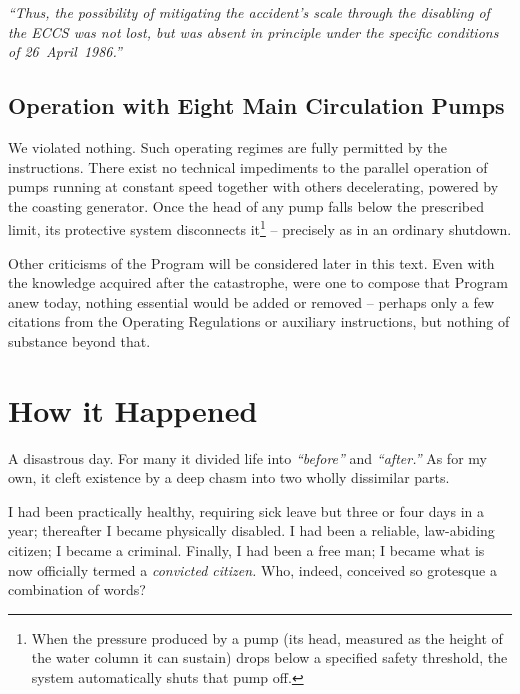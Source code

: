 \documentclass[openright]{bookest}
\begin{document}
\begin{personal}
\textit{``Thus, the possibility of mitigating the accident's scale through the disabling of the ECCS was not lost, but was absent in principle under the specific conditions of 26~April~1986.''}
\end{personal}

\section{Operation with Eight Main Circulation Pumps}

We violated nothing. Such operating regimes are fully permitted by the instructions. There exist no technical impediments to the parallel operation of pumps running at constant speed together with others decelerating, powered by the coasting generator. Once the head of any pump falls below the prescribed limit, its protective system disconnects it\footnote{When the pressure produced by a pump (its head, measured as the height of the water column it can sustain) drops below a specified safety threshold, the system automatically shuts that pump off.} -- precisely as in an ordinary shutdown.

Other criticisms of the Program will be considered later in this text. Even with the knowledge acquired after the catastrophe, were one to compose that Program anew today, nothing essential would be added or removed -- perhaps only a few citations from the Operating Regulations or auxiliary instructions, but nothing of substance beyond that.

\chapter{How it Happened}

A disastrous day. For many it divided life into \textit{``before''} and \textit{``after.''} As for my own, it cleft existence by a deep chasm into two wholly dissimilar parts.

I had been practically healthy, requiring sick leave but three or four days in a year; thereafter I became physically disabled. I had been a reliable, law-abiding citizen; I became a criminal. Finally, I had been a free man; I became what is now officially termed a \textit{convicted citizen.} Who, indeed, conceived so grotesque a combination of words?
\end{document}
